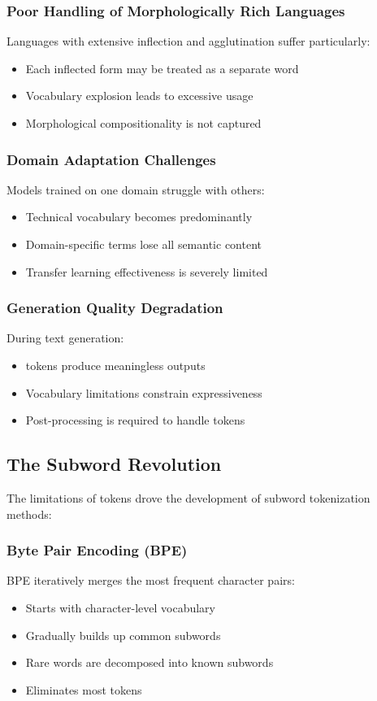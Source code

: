 \subsubsection{Poor Handling of Morphologically Rich Languages}
Languages with extensive inflection and agglutination suffer particularly:
\begin{itemize}
\item Each inflected form may be treated as a separate word
\item Vocabulary explosion leads to excessive \unk{} usage
\item Morphological compositionality is not captured
\end{itemize}

\subsubsection{Domain Adaptation Challenges}
Models trained on one domain struggle with others:
\begin{itemize}
\item Technical vocabulary becomes predominantly \unk{}
\item Domain-specific terms lose all semantic content
\item Transfer learning effectiveness is severely limited
\end{itemize}

\subsubsection{Generation Quality Degradation}
During text generation:
\begin{itemize}
\item \unk{} tokens produce meaningless outputs
\item Vocabulary limitations constrain expressiveness
\item Post-processing is required to handle \unk{} tokens
\end{itemize}

\subsection{The Subword Revolution}

The limitations of \unk{} tokens drove the development of subword tokenization methods:

\subsubsection{Byte Pair Encoding (BPE)}
BPE \citep{sennrich2016neural} iteratively merges the most frequent character pairs:
\begin{itemize}
\item Starts with character-level vocabulary
\item Gradually builds up common subwords
\item Rare words are decomposed into known subwords
\item Eliminates most \unk{} tokens
\end{itemize}

